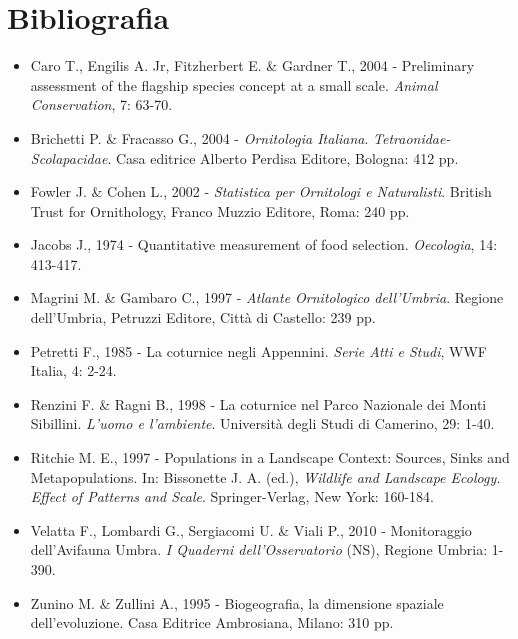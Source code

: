 \section*{Bibliografia}
\begin{itemize}\itemsep0pt
	\item Caro T., Engilis A. Jr, Fitzherbert E. \& Gardner T., 2004 - Preliminary
assessment of the flagship species concept at a small scale.
\textit{Animal Conservation}, 7: 63-70.

	\item Brichetti P. \& Fracasso G., 2004 - \textit{Ornitologia Italiana}.
\textit{Tetraonidae-Scolapacidae}. Casa editrice Alberto Perdisa
Editore, Bologna: 412 pp.

	\item Fowler J. \& Cohen L., 2002 - \textit{Statistica per Ornitologi e
Naturalisti}. British Trust for Ornithology, Franco Muzzio Editore,
Roma: 240 pp. 

	\item Jacobs J., 1974 - Quantitative measurement of food selection.
\textit{Oecologia}, 14: 413-417.

	\item Magrini M. \& Gambaro C., 1997 - \textit{Atlante Ornitologico
dell{\textquoteright}Umbria}. Regione dell{\textquoteright}Umbria,
Petruzzi Editore, Citt\`a di Castello: 239 pp.

	\item Petretti F., 1985 - La coturnice negli Appennini. \textit{Serie Atti e
Studi},  WWF Italia, 4: 2-24.

	\item Renzini F. \& Ragni B., 1998 - La coturnice nel Parco Nazionale dei
Monti Sibillini. \textit{L{\textquoteright}uomo e
l{\textquoteright}ambiente}. Universit\`a degli Studi di Camerino, 29:
1-40.

	\item Ritchie M. E., 1997 - Populations in a Landscape Context: Sources, Sinks
and Metapopulations. In: Bissonette J. A. (ed.), \textit{Wildlife and
Landscape Ecology. Effect of Patterns and Scale}. Springer-Verlag, New
York: 160-184.

	\item Velatta F., Lombardi G., Sergiacomi U. \& Viali P., 2010 - Monitoraggio
dell{\textquoteright}Avifauna Umbra. \textit{I Quaderni
dell{\textquoteright}Osservatorio} (NS), Regione Umbria: 1-390. 

	\item Zunino M. \& Zullini A., 1995 - Biogeografia, la dimensione
spaziale dell{\textquoteright}evoluzione. Casa Editrice Ambrosiana,
Milano: 310 pp.
\end{itemize}
